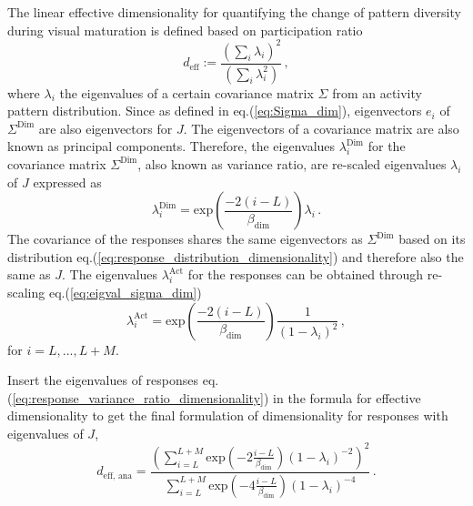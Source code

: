 \documentclass[11pt]{article}
\begin{document}
	The linear effective dimensionality
	for quantifying the change of pattern diversity during visual maturation is defined based on participation ratio 
		\begin{equation} \label{eq:effective_dimensionality_analytical}
			d_{\text{eff}} := \frac{\left(\sum_{i} \lambda_i\right)^2}{\left( \sum_{i} \lambda_i^2\right)} \, ,
		\end{equation}
	where $\lambda_i$ the eigenvalues of a certain covariance matrix $\Sigma$ from an activity pattern distribution. Since as defined in eq.(\ref{eq:Sigma_dim}), eigenvectors $e_i$ of $\Sigma^{\text{Dim}}$ are also eigenvectors for $J$. The eigenvectors of a covariance matrix are also known as principal components. Therefore, the eigenvalues $\lambda_i^{\text{Dim}}$ for the covariance matrix $\Sigma^{\text{Dim}}$, also known as variance ratio, are re-scaled eigenvalues $\lambda_i$ of $J$ expressed as
		\begin{equation} \label{eq:eigval_sigma_dim}
			\lambda_i^{\text{Dim}} = \text{exp}\left(\frac{-2(i-L)}{\beta_{\text{dim}}}\right) \lambda_i \, .
		\end{equation}
	The covariance of the responses shares the same eigenvectors as $\Sigma^{\text{Dim}}$ based on its distribution eq.(\ref{eq:response_distribution_dimensionality}) and therefore also the same as $J$. The eigenvalues $\lambda_i^{\text{Act}}$ for the responses can be obtained through re-scaling eq.(\ref{eq:eigval_sigma_dim}) 
		\begin{equation} \label{eq:response_variance_ratio_dimensionality}
			\lambda_i^{\text{Act}} = \text{exp}\left(\frac{-2(i-L)}{\beta_{\text{dim}}}\right) \frac{1}{(1-\lambda_i)^2} \, ,
		\end{equation}
	for $i = L, ..., L+M$. %
	
	Insert the eigenvalues of responses eq.(\ref{eq:response_variance_ratio_dimensionality}) in the formula for effective dimensionality to get the final formulation of dimensionality for responses with eigenvalues of $J$, 
		\begin{equation} \label{eq:dim_analytical_sym}
			d_{\text{eff, ana}} = \frac{\left(\sum_{i = L}^{L + M} \text{exp}\left(-2 \frac{i-L}{\beta_{\text{dim}}}\right)(1-\lambda_i)^{-2}\right)^2}{\sum_{i=L}^{L+M} \text{exp}\left(-4 \frac{i-L}{\beta_{\text{dim}}}\right)(1-\lambda_i)^{-4}} \, .
		\end{equation}
	
\end{document}

